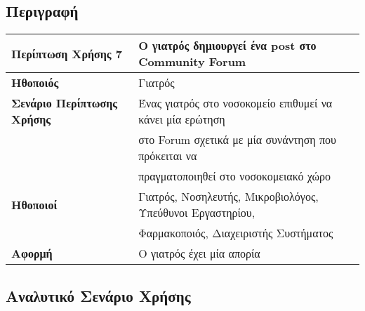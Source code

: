 \documentclass{article}
\newcommand\T{\rule{0pt}{2.6ex}}       %
\newcommand\B{\rule[-1.2ex]{0pt}{0pt}}
\begin{document}
\subsection{Περιγραφή}

\begin{center}
     \begin{tabular}{|l|l|}
     \hline
      \textbf{Περίπτωση Χρήσης 7} & Ο γιατρός δημιουργεί ένα post στο Community Forum \T\B \\ 
      \hline
      \textbf{Ηθοποιός} & Γιατρός \T\B \\
      \hline
      \textbf{Σενάριο Περίπτωσης Χρήσης} & Ένας γιατρός στο νοσοκομείο επιθυμεί να κάνει μία ερώτηση \T \\& στο Forum σχετικά με μία συνάντηση που πρόκειται να \\& πραγματοποιηθεί στο νοσοκομειακό χώρο \B \\
      \hline
      \textbf{Ηθοποιοί} & Γιατρός, Νοσηλευτής, Μικροβιολόγος, Υπεύθυνοι Εργαστηρίου, \T \\& Φαρμακοποιός, Διαχειριστής Συστήματος \B \\
      \hline
      \textbf{Αφορμή} &  Ο γιατρός έχει μία απορία\T\B \\
      \hline
     \end{tabular}
 \end{center}
 
 \newpage
 
  \subsection{Αναλυτικό Σενάριο Χρήσης}
\end{document}
